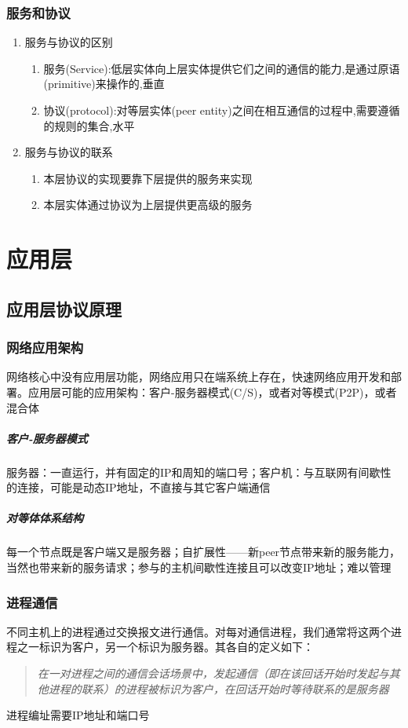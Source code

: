 \documentclass[]{report}
\begin{document}
		\subsection{服务和协议}
		\begin{enumerate}
			\item 服务与协议的区别
			\begin{enumerate}
				\item 服务(Service):低层实体向上层实体提供它们之间的通信的能力,是通过原语(primitive)来操作的,垂直
				\item 协议(protocol):对等层实体(peer entity)之间在相互通信的过程中,需要遵循的规则的集合,水平
			\end{enumerate}
			\item 服务与协议的联系
			\begin{enumerate}
				\item 本层协议的实现要靠下层提供的服务来实现
				\item 本层实体通过协议为上层提供更高级的服务
			\end{enumerate}
		\end{enumerate}

	\chapter{应用层}
	\section{应用层协议原理}
		\subsection{网络应用架构}
		网络核心中没有应用层功能，网络应用只在端系统上存在，快速网络应用开发和部署。应用层可能的应用架构：客户-服务器模式(C/S)，或者对等模式(P2P)，或者混合体
		\paragraph{客户-服务器模式}
		服务器：一直运行，并有固定的IP和周知的端口号；客户机：与互联网有间歇性的连接，可能是动态IP地址，不直接与其它客户端通信
		\paragraph{对等体体系结构}
		每一个节点既是客户端又是服务器；自扩展性——新peer节点带来新的服务能力，当然也带来新的服务请求；参与的主机间歇性连接且可以改变IP地址；难以管理
		\subsection{进程通信}
		不同主机上的进程通过交换报文进行通信。对每对通信进程，我们通常将这两个进程之一标识为客户，另一个标识为服务器。其各自的定义如下：
		\begin{quote}
			\textit{在一对进程之间的通信会话场景中，发起通信（即在该回话开始时发起与其他进程的联系）的进程被标识为客户，在回话开始时等待联系的是服务器}
		\end{quote}
		进程编址需要IP地址和端口号
\end{document}
